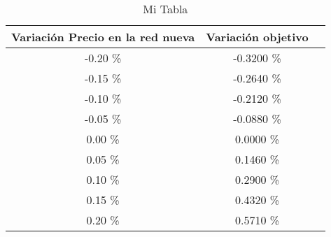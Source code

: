 \begin{table}
\centering
\begin{tabular}{|c|c|c|}
\hline
 Variación Precio en la red nueva & Variación objetivo \\ \hline
-0.20 \% & -0.3200 \% \\ \hline
-0.15 \% & -0.2640 \% \\ \hline
-0.10 \% & -0.2120 \% \\ \hline
-0.05 \% & -0.0880 \% \\ \hline
0.00 \% & 0.0000 \% \\ \hline
0.05 \% & 0.1460 \% \\ \hline
0.10 \% & 0.2900 \% \\ \hline
0.15 \% & 0.4320 \% \\ \hline
0.20 \% & 0.5710 \% \\ \hline
\end{tabular}
\caption{Mi Tabla}
\end{table}
